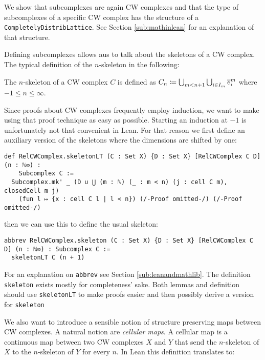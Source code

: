 We show that subcomplexes are again CW complexes and that the type of subcomplexes of a specific CW complex has the structure of a \lstinline|CompletelyDistribLattice|. 
See Section \ref{sub:mathinlean} for an explanation of that structure.  

Defining subcomplexes allows aus to talk about the skeletons of a CW complex. 
The typical definition of the $n$-skeleton in the following: 

\begin{defi}
  The $n$-skeleton of a CW complex $C$ is defined as $C_n \coloneq \bigcup_{m < n + 1} \bigcup_{i \in I_m} \closedCell{m}{i}$ where $-1 \le n \le \infty$.
\end{defi}

Since proofs about CW complexes frequently employ induction, we want to make using that proof technique as easy as possible. 
Starting an induction at $-1$ is unfortunately not that convenient in Lean. 
For that reason we first define an auxiliary version of the skeletons where the dimensions are shifted by one: 

\begin{lstlisting}[frame=single]
def RelCWComplex.skeletonLT (C : Set X) {D : Set X} [RelCWComplex C D] (n : ℕ∞) : 
    Subcomplex C :=
  Subcomplex.mk' _ (D ∪ ⋃ (m : ℕ) (_ : m < n) (j : cell C m), closedCell m j)
    (fun l ↦ {x : cell C l | l < n}) (/-Proof omitted-/) (/-Proof omitted-/)
\end{lstlisting}

then we can use this to define the usual skeleton: 

\begin{lstlisting}[frame=single]
abbrev RelCWComplex.skeleton (C : Set X) {D : Set X} [RelCWComplex C D] (n : ℕ∞) : Subcomplex C :=
  skeletonLT C (n + 1)
\end{lstlisting}

For an explanation on \lstinline|abbrev| see Section \ref{sub:leanandmathlib}.
The definition \lstinline|skeleton| exists mostly for completeness' sake. 
Both lemmas and definition should use \lstinline|skeletonLT| to make proofs easier and then possibly derive a version for \lstinline|skeleton|


We also want to introduce a sensible notion of structure preserving maps between CW complexes.
A natural notion are \emph{cellular maps}. 
A cellular map is a continuous map between two CW complexes $X$ and $Y$ that send the $n$-skeleton of $X$ to the $n$-skeleton of $Y$ for every $n$.
In Lean this definition translates to: 

